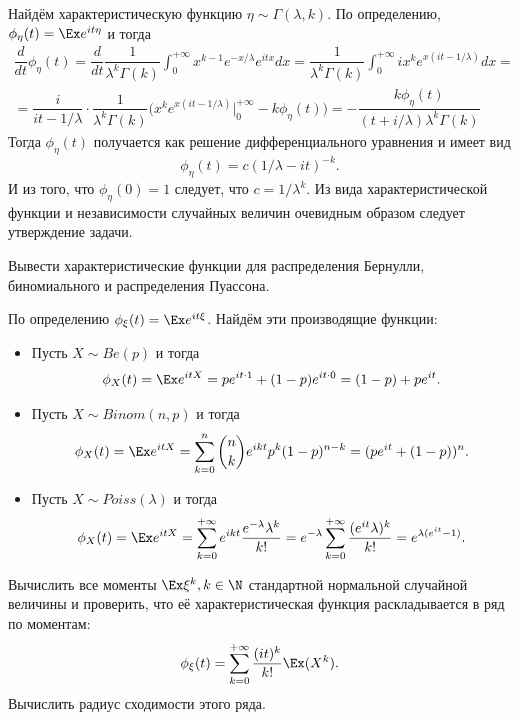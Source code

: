 \begin{solution}
    Найдём характеристическую функцию $\eta \sim \Gamma(\lambda, k)$.
    По определению, $\phi_\eta (t) = \Ex e^{it\eta}$ и тогда
    \begin{multline*}
        \dfrac{d}{dt} \phi_{\eta}(t) = \dfrac{d}{dt}\dfrac{1}{\lambda^k \Gamma(k)}\int_0^{+\infty} x^{k - 1}e^{-x/\lambda}e^{itx}dx = \dfrac{1}{\lambda^k \Gamma(k)} \int_0^{+\infty} ix^k e^{x(it - 1/\lambda)}dx = \\ =
        \dfrac{i}{it - 1/\lambda} \cdot \dfrac{1}{\lambda^k \Gamma(k)}\biggr(x^ke^{x(it - 1/\lambda)}\biggr|_0^{+\infty} - k\phi_\eta(t)\biggr) = -\dfrac{k\phi_\eta(t)}{(t + i/\lambda)\lambda^k \Gamma(k)}
    \end{multline*}
    Тогда $\phi_\eta(t)$ получается как решение дифференциального уравнения и имеет вид
    \[
        \phi_{\eta}(t) = c(1/\lambda - it)^{-k}.
    \]
    И из того, что $\phi_\eta(0) = 1$ следует, что $c = 1/\lambda^k$.
    Из вида характеристической функции и независимости случайных величин очевидным образом следует утверждение задачи.
\end{solution}
\begin{problem}
    Вывести характеристические функции для распределения Бернулли, биномиального и распределения Пуассона.
\end{problem}
\begin{solution} По определению $\phi_\xi(t) = \Ex e^{it\xi}$. Найдём эти производящие функции:
    \begin{itemize}
        \item Пусть $X \sim Be(p)$ и тогда
        \[
            \phi_X(t) = \Ex e^{itX} = pe^{it \cdot 1} + (1 - p)e^{it \cdot 0} = (1 - p) + pe^{it}.
        \]
        \item Пусть $X \sim Binom(n, p)$ и тогда
        \[
            \phi_X(t) = \Ex e^{itX} = \sum\limits_{k = 0}^n \binom{n}{k}e^{ikt}p^k(1 - p)^{n - k} = (pe^{it} + (1 - p))^n.
        \]
        \item Пусть $X \sim Poiss(\lambda)$ и тогда
        \[
            \phi_X(t) = \Ex e^{itX} = \sum\limits_{k = 0}^{+\infty} e^{ikt} \dfrac{e^{-\lambda}\lambda^k}{k!} = e^{-\lambda}\sum\limits_{k = 0}^{+\infty} \dfrac{(e^{it}\lambda)^k}{k!} = e^{\lambda(e^{it} - 1)}.
        \]
    \end{itemize}
\end{solution}
\begin{problem}
    Вычислить все моменты $\Ex \xi^k, k \in \N$ стандартной нормальной случайной величины и проверить, что её характеристическая функция раскладывается в ряд по моментам:
    \[
        \phi_{\xi}(t) = \sum\limits_{k = 0}^{+\infty} \dfrac{(it)^k}{k!}\Ex(X^k).
    \]
    Вычислить радиус сходимости этого ряда.
\end{problem}
